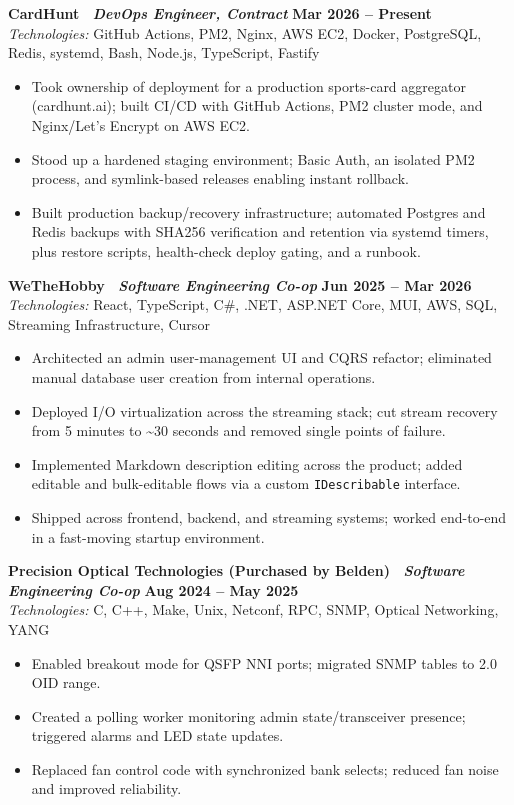 \documentclass[10pt]{article}
\newcommand{\Role}[1]{{\youngserif\bfseries #1}}
\newcommand{\EntryGap}{\vspace{1.5pt}}
\newcommand{\Meta}[1]{{\youngserif\textbar{}\ \itshape\color{Slate}#1}}
\newcommand{\Date}[1]{{\youngserif\bfseries #1}}
\newcommand{\Tech}[1]{{\itshape Technologies:} #1}
\newcommand{\Action}[1]{{\color{Accent}#1}}
\begin{document}
{\Role{CardHunt \Meta{DevOps Engineer, Contract}}} \hfill \Date{Mar 2026 -- Present} \\
\Tech{GitHub Actions, PM2, Nginx, AWS EC2, Docker, PostgreSQL, Redis, systemd, Bash, Node.js, TypeScript, Fastify}
\begin{itemize}
  \item Took ownership of deployment for a production sports-card aggregator (cardhunt.ai); built \Action{CI/CD} with GitHub Actions, PM2 cluster mode, and Nginx/Let's Encrypt on \Action{AWS EC2}.
  \item Stood up a \Action{hardened staging environment}; Basic Auth, an isolated PM2 process, and symlink-based releases enabling \Action{instant rollback}.
  \item Built production \Action{backup/recovery infrastructure}; automated Postgres and Redis backups with SHA256 verification and retention via systemd timers, plus restore scripts, health-check deploy gating, and a runbook.
\end{itemize}
\EntryGap

{\Role{WeTheHobby \Meta{Software Engineering Co-op}}} \hfill \Date{Jun 2025 -- Mar 2026} \\
\Tech{React, TypeScript, C\#, .NET, ASP.NET Core, MUI, AWS, SQL, Streaming Infrastructure, Cursor}
\begin{itemize}
  \item Architected an admin user-management UI and \Action{CQRS refactor}; \Action{eliminated manual database user creation} from internal operations.
  \item Deployed I/O virtualization across the streaming stack; \Action{cut stream recovery from 5 minutes to \textasciitilde{}30 seconds} and removed single points of failure.
  \item Implemented \Action{Markdown description editing} across the product; added editable and bulk-editable flows via a custom \texttt{IDescribable} interface.
  \item Shipped across frontend, backend, and streaming systems; worked end-to-end in a fast-moving startup environment.
\end{itemize}
\EntryGap

{\Role{Precision Optical Technologies (Purchased by Belden) \Meta{Software Engineering Co-op}}} \hfill \Date{Aug 2024 -- May 2025} \\
\Tech{C, C++, Make, Unix, Netconf, RPC, SNMP, Optical Networking, YANG}
\begin{itemize}
  \item Enabled \Action{breakout mode for QSFP NNI ports}; migrated SNMP tables to 2.0 OID range.
  \item Created a \Action{polling worker} monitoring admin state/transceiver presence; triggered alarms and LED state updates.
  \item Replaced fan control code with synchronized bank selects; \Action{reduced fan noise and improved reliability}.
\end{itemize}
\EntryGap
\end{document}
